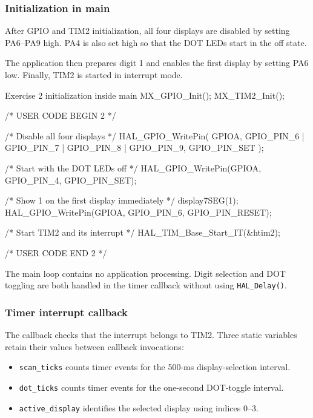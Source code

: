 \documentclass[a4paper]{article}
\begin{document}
\subsubsection{Initialization in main}

After GPIO and TIM2 initialization, all four
displays are disabled by setting PA6--PA9 high.
PA4 is also set high so that the DOT LEDs
start in the off state.

The application then prepares digit 1 and enables
the first display by setting PA6 low.
Finally, TIM2 is started in interrupt mode.

\begin{stmcode}{Exercise 2 initialization inside main}
MX_GPIO_Init();
MX_TIM2_Init();

/* USER CODE BEGIN 2 */

/* Disable all four displays */
HAL_GPIO_WritePin(
    GPIOA,
    GPIO_PIN_6 | GPIO_PIN_7 | GPIO_PIN_8 | GPIO_PIN_9,
    GPIO_PIN_SET
);

/* Start with the DOT LEDs off */
HAL_GPIO_WritePin(GPIOA, GPIO_PIN_4, GPIO_PIN_SET);

/* Show 1 on the first display immediately */
display7SEG(1);
HAL_GPIO_WritePin(GPIOA, GPIO_PIN_6, GPIO_PIN_RESET);

/* Start TIM2 and its interrupt */
HAL_TIM_Base_Start_IT(&htim2);

/* USER CODE END 2 */
\end{stmcode}

The main loop contains no application processing.
Digit selection and DOT toggling are both handled
in the timer callback without using
\texttt{HAL\_Delay()}.

\subsubsection{Timer interrupt callback}

The callback checks that the interrupt belongs
to TIM2. Three static variables retain their values
between callback invocations:
\begin{itemize}
    \item \texttt{scan\_ticks} counts timer events
          for the 500-ms display-selection interval.
    \item \texttt{dot\_ticks} counts timer events
          for the one-second DOT-toggle interval.
    \item \texttt{active\_display} identifies the
          selected display using indices 0--3.
\end{itemize}
\end{document}
